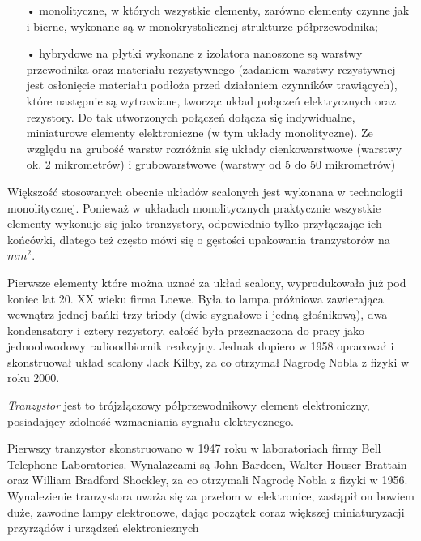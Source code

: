 \documentclass[a4paper,11pt]{article}
\begin{document}
\begin{enumerate}

\item[•]  monolityczne, w których wszystkie elementy, zarówno elementy czynne jak i bierne, wykonane są w monokrystalicznej strukturze półprzewodnika;

\item[•] hybrydowe na płytki wykonane z izolatora nanoszone są warstwy przewodnika oraz materiału rezystywnego (zadaniem warstwy rezystywnej jest osłonięcie materiału podłoża przed działaniem czynników trawiących), które następnie są wytrawiane, tworząc układ połączeń elektrycznych oraz rezystory. Do tak utworzonych połączeń dołącza się indywidualne, miniaturowe elementy elektroniczne (w tym układy monolityczne). Ze względu na grubość warstw rozróżnia się układy cienkowarstwowe (warstwy ok. 2 mikrometrów) i grubowarstwowe (warstwy od 5 do 50 mikrometrów)

\end{enumerate}

Większość stosowanych obecnie układów scalonych jest wykonana w technologii monolitycznej. Ponieważ w układach monolitycznych praktycznie wszystkie elementy wykonuje się jako tranzystory, odpowiednio tylko przyłączając ich końcówki, dlatego też często mówi się o gęstości upakowania tranzystorów na $mm^{2}.$

Pierwsze elementy które można uznać za układ scalony, wyprodukowała już pod koniec lat 20. XX wieku firma Loewe. Była to lampa próżniowa zawierająca wewnątrz jednej bańki trzy triody (dwie sygnałowe i jedną głośnikową), dwa kondensatory i cztery rezystory, całość była przeznaczona do pracy jako jednoobwodowy radioodbiornik reakcyjny. Jednak dopiero w 1958 opracował i skonstruował układ scalony Jack Kilby, za co otrzymał Nagrodę Nobla z fizyki w roku 2000. 

\vspace{3mm}
\textit{Tranzystor} jest to trójzłączowy półprzewodnikowy element elektroniczny, posiadający zdolność wzmacniania sygnału elektrycznego.

Pierwszy tranzystor skonstruowano w 1947 roku w laboratoriach firmy Bell Telephone Laboratories. Wynalazcami są John Bardeen, Walter Houser Brattain oraz William Bradford Shockley, za co otrzymali Nagrodę Nobla z fizyki w 1956. Wynalezienie tranzystora uważa się za przełom w~elektronice, zastąpił on bowiem duże, zawodne lampy elektronowe, dając początek coraz większej miniaturyzacji przyrządów i urządzeń elektronicznych
\end{document}
